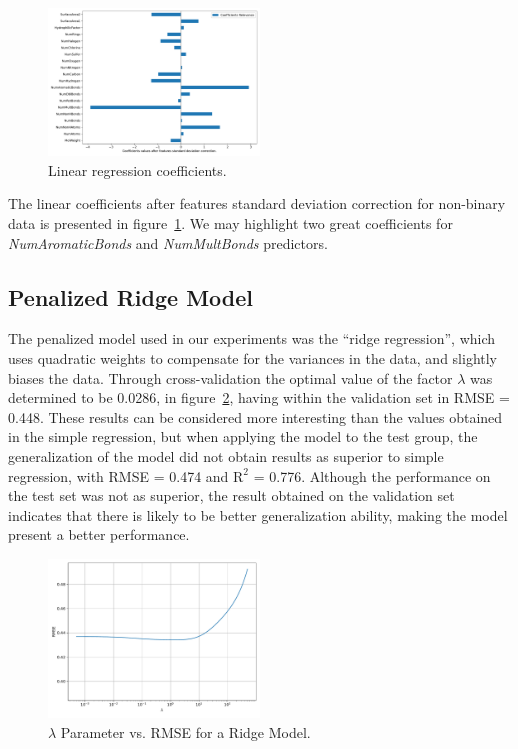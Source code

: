 \begin{figure}[htbp!]
  \centerline{\includegraphics[width=0.5\textwidth]{../../code/hw2/figures/2-linear-regression-coefficients.pdf}}
  \caption{Linear regression coefficients.}
  \label{fig:2-linear-regression-coefficients}
\end{figure}

The linear coefficients after features standard deviation correction for non-binary data is presented in figure~\ref{fig:2-linear-regression-coefficients}. We may highlight two great coefficients for \textit{NumAromaticBonds} and \textit{NumMultBonds} predictors.

\subsection{Penalized Ridge Model}
The penalized model used in our experiments was the ``ridge regression'', which uses quadratic weights to compensate for the variances in the data, and slightly biases the data. Through cross-validation the optimal value of the factor $\lambda$ was determined to be 0.0286, in figure~\ref{fig:3-lambda-ridge}, having within the validation set in RMSE = 0.448. These results can be considered more interesting than the values obtained in the simple regression, but when applying the model to the test group, the generalization of the model did not obtain results as superior to simple regression, with RMSE = 0.474 and $\text{R}^2$ = 0.776. Although the performance on the test set was not as superior, the result obtained on the validation set indicates that there is likely to be better generalization ability, making the model present a better performance.

\begin{figure}[htbp!]
  \centerline{\includegraphics[width=0.5\textwidth]{../../code/hw2/figures/3-lambda-ridge.pdf}}
  \caption{$\lambda$ Parameter vs. RMSE for a Ridge Model.}
  \label{fig:3-lambda-ridge}
\end{figure}

